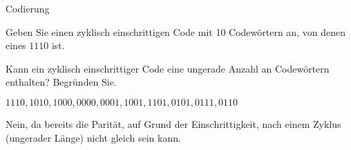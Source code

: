 \documentclass{exercisesheet}
\begin{document}
\begin{exercises}{Codierung}
\item Geben Sie einen zyklisch einschrittigen Code mit 10 Codewörtern an, von denen eines $1110$ ist.
\item Kann ein zyklisch einschrittiger Code eine ungerade Anzahl an Codewörtern enthalten? Begründen Sie.
\end{exercises}

\begin{solutions}
  \item $1110, 1010, 1000, 0000, 0001, 1001, 1101, 0101, 0111, 0110$
  \item Nein, da bereits die Parität, auf Grund der Einschrittigkeit, nach einem Zyklus (ungerader Länge) nicht gleich sein kann.
\end{solutions}
\end{document}
